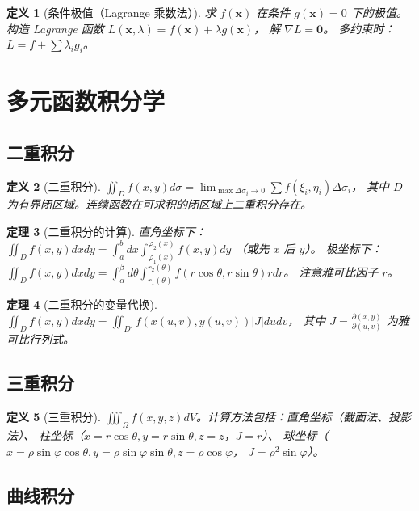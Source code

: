 \documentclass[12pt,a4paper]{ctexart}
\newtheorem{theorem}{定理}[section]
\newtheorem{definition}[theorem]{定义}
\theoremstyle{remark}
\begin{document}
\begin{definition}[条件极值（Lagrange 乘数法）]
求 $f(\mathbf{x})$ 在条件 $g(\mathbf{x})=0$ 下的极值。构造 Lagrange 函数
$L(\mathbf{x},\lambda) = f(\mathbf{x}) + \lambda g(\mathbf{x})$，
解 $\nabla L = \mathbf{0}$。
多约束时：$L = f + \sum \lambda_i g_i$。
\end{definition}

\section{多元函数积分学}

\subsection{二重积分}

\begin{definition}[二重积分]
$\iint_D f(x,y) d\sigma = \lim_{\max \Delta\sigma_i \to 0} \sum f(\xi_i,\eta_i)\Delta\sigma_i$，
其中 $D$ 为有界闭区域。连续函数在可求积的闭区域上二重积分存在。
\end{definition}

\begin{theorem}[二重积分的计算]
直角坐标下：$\iint_D f(x,y) dxdy = \int_a^b dx \int_{\varphi_1(x)}^{\varphi_2(x)} f(x,y) dy$
（或先 $x$ 后 $y$）。
极坐标下：$\iint_D f(x,y) dxdy = \int_{\alpha}^{\beta} d\theta \int_{r_1(\theta)}^{r_2(\theta)} f(r\cos\theta,r\sin\theta) r dr$。
注意雅可比因子 $r$。
\end{theorem}

\begin{theorem}[二重积分的变量代换]
$\iint_D f(x,y) dxdy = \iint_{D'} f(x(u,v), y(u,v)) |J| dudv$，
其中 $J = \frac{\partial(x,y)}{\partial(u,v)}$ 为雅可比行列式。
\end{theorem}

\subsection{三重积分}

\begin{definition}[三重积分]
$\iiint_\Omega f(x,y,z) dV$。计算方法包括：直角坐标（截面法、投影法）、
柱坐标（$x=r\cos\theta,y=r\sin\theta,z=z$，$J=r$）、
球坐标（$x=\rho\sin\varphi\cos\theta,y=\rho\sin\varphi\sin\theta,z=\rho\cos\varphi$，
$J=\rho^2\sin\varphi$）。
\end{definition}

\subsection{曲线积分}
\end{document}
